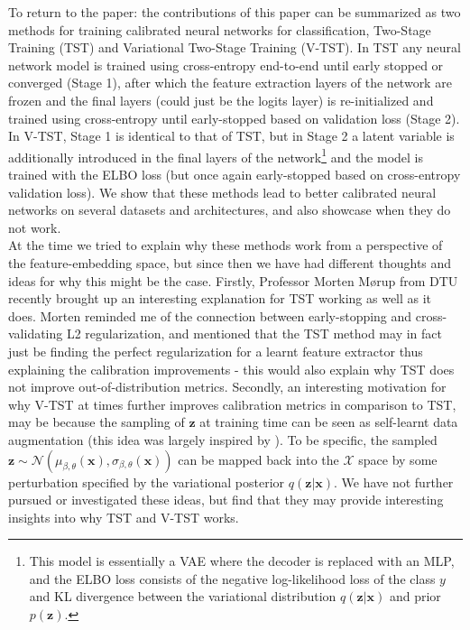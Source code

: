\noindent To return to the paper: the contributions of this paper can be summarized as two methods for training calibrated neural networks for classification, Two-Stage Training (TST) and Variational Two-Stage Training (V-TST). In TST any neural network model is trained using cross-entropy end-to-end until early stopped or converged (Stage 1), after which the feature extraction layers of the network are frozen and the final layers (could just be the logits layer) is re-initialized and trained using cross-entropy until early-stopped based on validation loss (Stage 2). In V-TST, Stage 1 is identical to that of TST, but in Stage 2 a latent variable is additionally introduced in the final layers of the network\footnote{This model is essentially a VAE where the decoder is replaced with an MLP, and the ELBO loss consists of the negative log-likelihood loss of the class $y$ and KL divergence between the variational distribution $q(\mathbf{z}|\mathbf{x})$ and prior $p(\mathbf{z})$.} and the model is trained with the ELBO loss (but once again early-stopped based on cross-entropy validation loss). We show that these methods lead to better calibrated neural networks on several datasets and architectures, and also showcase when they do not work.\\

\noindent At the time we tried to explain why these methods work from a perspective of the feature-embedding space, but since then we have had different thoughts and ideas for why this might be the case. Firstly, Professor Morten Mørup from DTU recently brought up an interesting explanation for TST working as well as it does. Morten reminded me of the connection between early-stopping and cross-validating L2 regularization, and mentioned that the TST method may in fact just be finding the perfect regularization for a learnt feature extractor thus explaining the calibration improvements - this would also explain why TST does not improve out-of-distribution metrics. Secondly, an interesting motivation for why V-TST at times further improves calibration metrics in comparison to TST, may be because the sampling of $\mathbf{z}$ at training time can be seen as self-learnt data augmentation (this idea was largely inspired by \cite{Trinh2022TacklingCS}). To be specific, the sampled $\mathbf{z} \sim \mathcal{N}(\mu_{\beta, \theta}(\mathbf{x}), \sigma_{\beta, \theta}(\mathbf{x}))$ can be mapped back into the $\mathcal{X}$ space by some perturbation specified by the variational posterior $q(\mathbf{z}|\mathbf{x})$. We have not further pursued or investigated these ideas, but find that they may provide interesting insights into why TST and V-TST works.

\noindent 



